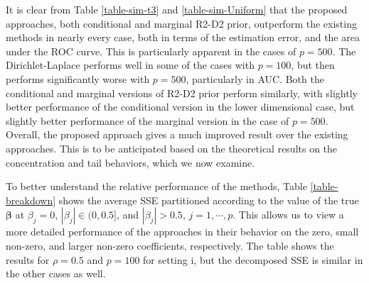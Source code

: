 \documentclass[12pt]{article}
\begin{document}
It is clear from Table \ref{table-sim-t3} and \ref{table-sim-Uniform} that the proposed approaches, both conditional and marginal R2-D2 prior, outperform the existing methods in nearly every case, both in terms of the estimation error, and the area under the ROC curve. This is particularly apparent in the cases of $p=500$.
The Dirichlet-Laplace performs well in some of the cases with $p=100$, but then performs significantly worse with $p=500$, particularly in AUC.
 Both the conditional and marginal versions of R2-D2 prior perform similarly, with slightly better performance of the conditional version  in the lower dimensional case, but slightly better performance of the marginal version in the case of $p = 500$. Overall, the proposed approach gives a much improved result over the existing approaches. This is to be anticipated based on the theoretical results on the concentration and tail behaviors, which we now examine.





To better understand the relative performance of the methods, Table \ref{table-breakdown} shows the average SSE partitioned according to the value of the true $ \bm{\beta}$ at  $\beta_j=0$, $|\beta_j|\in (0,0.5]$,  and $|\beta_j| > 0.5$,  $j=1,\cdots,p$. This allows us to view a more detailed performance of the approaches in their behavior on the zero, small non-zero, and larger non-zero coefficients, respectively. The table shows the results for $\rho = 0.5$ and $p = 100$ for setting i, but the decomposed SSE is similar in the other cases as well.
\end{document}
